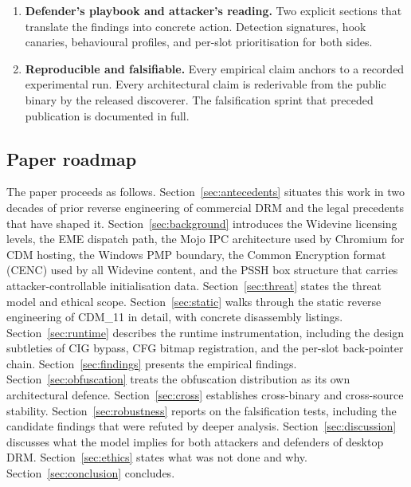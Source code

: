 \documentclass[11pt,letterpaper]{article}
\begin{document}
\begin{enumerate}[itemsep=4pt,topsep=2pt]
  \item \textbf{Defender's playbook and attacker's reading.}  Two
        explicit sections that translate the findings into concrete
        action.  Detection signatures, hook canaries, behavioural
        profiles, and per-slot prioritisation for both sides.

  \item \textbf{Reproducible and falsifiable.}  Every empirical claim
        anchors to a recorded experimental run.  Every architectural
        claim is rederivable from the public binary by the released
        discoverer.  The falsification sprint that preceded
        publication is documented in full.
\end{enumerate}

\subsection*{Paper roadmap}

The paper proceeds as follows. Section~\ref{sec:antecedents} situates
this work in two decades of prior reverse engineering of commercial
DRM and the legal precedents that have shaped it.
Section~\ref{sec:background} introduces the Widevine licensing
levels, the EME dispatch path, the Mojo IPC architecture used by
Chromium for CDM hosting, the Windows PMP boundary, the Common
Encryption format (CENC) used by all Widevine content, and the PSSH
box structure that carries attacker-controllable initialisation data.
Section~\ref{sec:threat} states the threat model and ethical scope.
Section~\ref{sec:static} walks through the static reverse engineering
of CDM\_11 in detail, with concrete disassembly listings.
Section~\ref{sec:runtime} describes the runtime instrumentation,
including the design subtleties of CIG bypass, CFG bitmap
registration, and the per-slot back-pointer chain.
Section~\ref{sec:findings} presents the empirical findings.
Section~\ref{sec:obfuscation} treats the obfuscation distribution as
its own architectural defence. Section~\ref{sec:cross} establishes
cross-binary and cross-source stability. Section~\ref{sec:robustness}
reports on the falsification tests, including the candidate findings
that were refuted by deeper analysis. Section~\ref{sec:discussion}
discusses what the model implies for both attackers and defenders of
desktop DRM. Section~\ref{sec:ethics} states what was not done and
why. Section~\ref{sec:conclusion} concludes.
\end{document}
